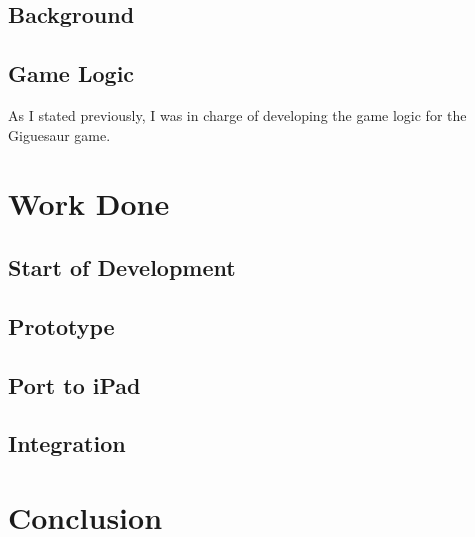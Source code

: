 \documentclass{article}
\begin{document}
\subsection{Background}

\subsection{Game Logic}
As I stated previously, I was in charge of developing the game logic for the Giguesaur game.


\section{Work Done}

\subsection{Start of Development}

\subsection{Prototype}

\subsection{Port to iPad}

\subsection{Integration}


\section{Conclusion}

\end{document}
